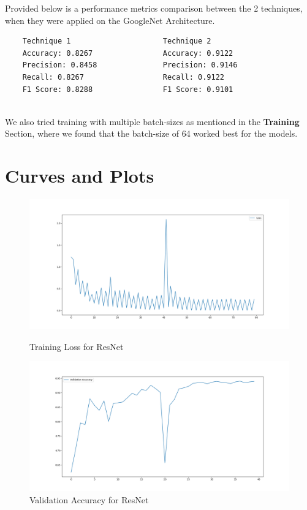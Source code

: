 \documentclass{article}
\begin{document}
Provided below is a performance metrics comparison between the 2 techniques, when they were applied on the GoogleNet Architecture.

\begin{lstlisting}
    Technique 1                     Technique 2
    Accuracy: 0.8267                Accuracy: 0.9122
    Precision: 0.8458               Precision: 0.9146
    Recall: 0.8267                  Recall: 0.9122
    F1 Score: 0.8288                F1 Score: 0.9101
\end{lstlisting}\\

We also tried training with multiple batch-sizes as mentioned in the \textbf{Training} Section, where we found that the batch-size of 64 worked best for the models.

\section{Curves and Plots}
\begin{figure}[!hp]
  \centering
  \begin{minipage}[b]{\textwidth}
    \includegraphics[width=\textwidth]{loss_history_RN.png}
    \caption{Training Loss for ResNet}
  \end{minipage}
  \hfill
  \begin{minipage}[b]{\textwidth}
    \includegraphics[width=\textwidth]{val_acc_history_RN.png}
    \caption{Validation Accuracy for ResNet}
  \end{minipage}
\end{figure}
\end{document}
